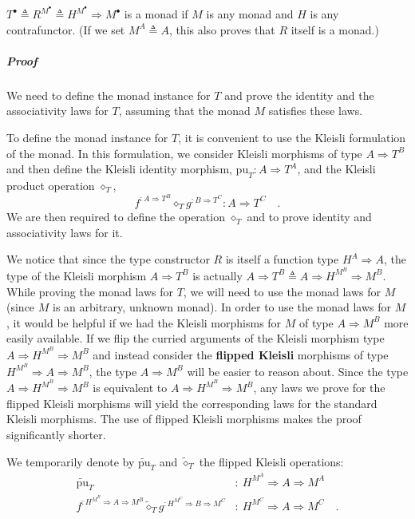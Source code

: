 $T^{\bullet}\triangleq R^{M^{\bullet}}\triangleq H^{M^{\bullet}}\Rightarrow M^{\bullet}$
is a monad if $M$ is any monad and $H$ is any contrafunctor. (If
we set $M^{A}\triangleq A$, this also proves that $R$ itself is
a monad.)

\subparagraph{Proof}

We need to define the monad instance for $T$ and prove the identity
and the associativity laws for $T$, assuming that the monad $M$
satisfies these laws.

To define the monad instance for $T$, it is convenient to use the
Kleisli formulation of the monad. In this formulation, we consider
Kleisli morphisms of type $A\Rightarrow T^{B}$ and then define the
Kleisli identity morphism, $\text{pu}_{T}:A\Rightarrow T^{A}$, and
the Kleisli product operation $\diamond_{T}$,
\[
f^{:A\Rightarrow T^{B}}\diamond_{T}g^{:B\Rightarrow T^{C}}:A\Rightarrow T^{C}\quad.
\]
We are then required to define the operation $\diamond_{T}$ and to
prove identity and associativity laws for it.

We notice that since the type constructor $R$ is itself a function
type $H^{A}\Rightarrow A$, the type of the Kleisli morphism $A\Rightarrow T^{B}$
is actually $A\Rightarrow T^{B}\triangleq A\Rightarrow H^{M^{B}}\Rightarrow M^{B}$.
While proving the monad laws for $T$, we will need to use the monad
laws for $M$ (since $M$ is an arbitrary, unknown monad). In order
to use the monad laws for $M$, it would be helpful if we had the
Kleisli morphisms for $M$ of type $A\Rightarrow M^{B}$ more easily
available. If we flip the curried arguments of the Kleisli morphism
type $A\Rightarrow H^{M^{B}}\Rightarrow M^{B}$ and instead consider
the \textbf{flipped Kleisli} morphisms of
type $H^{M^{B}}\Rightarrow A\Rightarrow M^{B}$, the type $A\Rightarrow M^{B}$
will be easier to reason about. Since the type $A\Rightarrow H^{M^{B}}\Rightarrow M^{B}$
is equivalent to $A\Rightarrow H^{M^{B}}\Rightarrow M^{B}$, any laws
we prove for the flipped Kleisli morphisms will yield the corresponding
laws for the standard Kleisli morphisms. The use of flipped Kleisli
morphisms makes the proof significantly shorter.

We temporarily denote by $\tilde{\text{pu}}_{T}$ and $\tilde{\diamond}_{T}$
the flipped Kleisli operations:
\begin{align*}
\tilde{\text{pu}}_{T} & :\ H^{M^{A}}\Rightarrow A\Rightarrow M^{A}\\
f^{:H^{M^{B}}\Rightarrow A\Rightarrow M^{B}}\tilde{\diamond}_{T}g^{:H^{M^{C}}\Rightarrow B\Rightarrow M^{C}} & :\ H^{M^{C}}\Rightarrow A\Rightarrow M^{C}\quad.
\end{align*}

